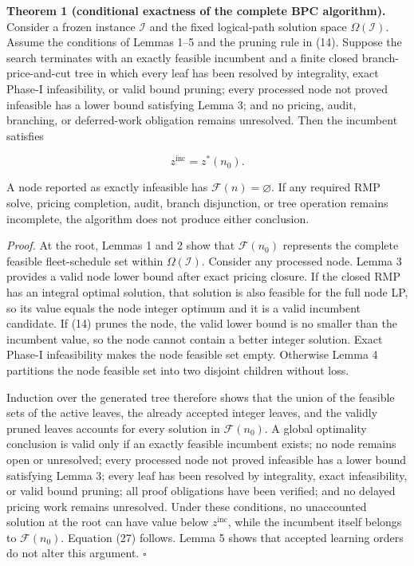 \documentclass[
  11pt,
]{article}
\begin{document}
\textbf{Theorem 1 (conditional exactness of the complete BPC
algorithm).} Consider a frozen instance \(\mathcal{I}\) and the fixed
logical-path solution space \(\Omega(\mathcal{I})\). Assume the
conditions of Lemmas 1--5 and the pruning rule in (14). Suppose the
search terminates with an exactly feasible incumbent and a finite closed
branch-price-and-cut tree in which every leaf has been resolved by
integrality, exact Phase-I infeasibility, or valid bound pruning; every
processed node not proved infeasible has a lower bound satisfying Lemma
3; and no pricing, audit, branching, or deferred-work obligation remains
unresolved. Then the incumbent satisfies

\[
z^{\mathrm{inc}}=z^*(n_0).
\tag{27}
\]

A node reported as exactly infeasible has
\(\mathcal{F}(n)=\varnothing\). If any required RMP solve, pricing
completion, audit, branch disjunction, or tree operation remains
incomplete, the algorithm does not produce either conclusion.

\emph{Proof.} At the root, Lemmas 1 and 2 show that \(\mathcal{F}(n_0)\)
represents the complete feasible fleet-schedule set within
\(\Omega(\mathcal{I})\). Consider any processed node. Lemma 3 provides a
valid node lower bound after exact pricing closure. If the closed RMP
has an integral optimal solution, that solution is also feasible for the
full node LP, so its value equals the node integer optimum and it is a
valid incumbent candidate. If (14) prunes the node, the valid lower
bound is no smaller than the incumbent value, so the node cannot contain
a better integer solution. Exact Phase-I infeasibility makes the node
feasible set empty. Otherwise Lemma 4 partitions the node feasible set
into two disjoint children without loss.

Induction over the generated tree therefore shows that the union of the
feasible sets of the active leaves, the already accepted integer leaves,
and the validly pruned leaves accounts for every solution in
\(\mathcal{F}(n_0)\). A global optimality conclusion is valid only if an
exactly feasible incumbent exists; no node remains open or unresolved;
every processed node not proved infeasible has a lower bound satisfying
Lemma 3; every leaf has been resolved by integrality, exact
infeasibility, or valid bound pruning; all proof obligations have been
verified; and no delayed pricing work remains unresolved. Under these
conditions, no unaccounted solution at the root can have value below
\(z^{\mathrm{inc}}\), while the incumbent itself belongs to
\(\mathcal{F}(n_0)\). Equation (27) follows. Lemma 5 shows that accepted
learning orders do not alter this argument. \(\square\)
\end{document}
